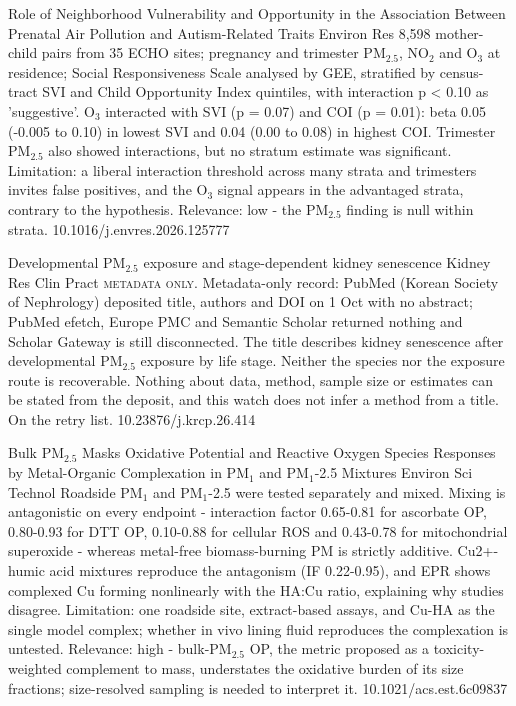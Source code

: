\documentclass[10pt]{article}
\begin{document}
\par{}\baselineskip{}\baselineskip
{}

{Role of Neighborhood Vulnerability and Opportunity in the Association Between Prenatal Air Pollution and Autism-Related Traits}
{Environ Res}
{8,598 mother-child pairs from 35 ECHO sites; pregnancy and trimester PM$_{2.5}$, NO$_2$ and O$_3$ at residence; Social Responsiveness Scale analysed by GEE, stratified by census-tract SVI and Child Opportunity Index quintiles, with interaction p < 0.10 as 'suggestive'. O$_3$ interacted with SVI (p = 0.07) and COI (p = 0.01): beta 0.05 (-0.005 to 0.10) in lowest SVI and 0.04 (0.00 to 0.08) in highest COI. Trimester PM$_{2.5}$ also showed interactions, but no stratum estimate was significant. Limitation: a liberal interaction threshold across many strata and trimesters invites false positives, and the O$_3$ signal appears in the advantaged strata, contrary to the hypothesis. Relevance: low - the PM$_{2.5}$ finding is null within strata.}
{10.1016/j.envres.2026.125777}

{Developmental PM$_{2.5}$ exposure and stage-dependent kidney senescence}
{Kidney Res Clin Pract}
{\textsc{metadata only.} Metadata-only record: PubMed (Korean Society of Nephrology) deposited title, authors and DOI on 1 Oct with no abstract; PubMed efetch, Europe PMC and Semantic Scholar returned nothing and Scholar Gateway is still disconnected. The title describes kidney senescence after developmental PM$_{2.5}$ exposure by life stage. Neither the species nor the exposure route is recoverable. Nothing about data, method, sample size or estimates can be stated from the deposit, and this watch does not infer a method from a title. On the retry list.}
{10.23876/j.krcp.26.414}

\par{}\baselineskip{}\baselineskip
{}

{Bulk PM$_{2.5}$ Masks Oxidative Potential and Reactive Oxygen Species Responses by Metal-Organic Complexation in PM$_{1}$ and PM$_{1}$-2.5 Mixtures}
{Environ Sci Technol}
{Roadside PM$_{1}$ and PM$_{1}$-2.5 were tested separately and mixed. Mixing is antagonistic on every endpoint - interaction factor 0.65-0.81 for ascorbate OP, 0.80-0.93 for DTT OP, 0.10-0.88 for cellular ROS and 0.43-0.78 for mitochondrial superoxide - whereas metal-free biomass-burning PM is strictly additive. Cu2+-humic acid mixtures reproduce the antagonism (IF 0.22-0.95), and EPR shows complexed Cu forming nonlinearly with the HA:Cu ratio, explaining why studies disagree. Limitation: one roadside site, extract-based assays, and Cu-HA as the single model complex; whether in vivo lining fluid reproduces the complexation is untested. Relevance: high - bulk-PM$_{2.5}$ OP, the metric proposed as a toxicity-weighted complement to mass, understates the oxidative burden of its size fractions; size-resolved sampling is needed to interpret it.}
{10.1021/acs.est.6c09837}
\end{document}
